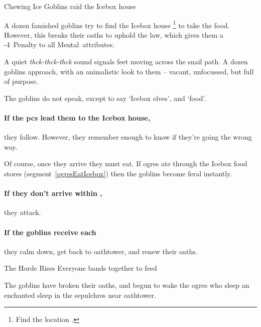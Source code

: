\begin{multicols}{2}
\stupifiedElf

\showStdSpells

{Chewing Ice}%
{Goblins raid the Icebox house}%

A dozen famished goblins try to find the Icebox house%
\footnote{Find the location .}
to take the food.
However, this breaks their oaths to uphold the law, which gives them a -4~Penalty to all Mental~\glspl{attribute}.

\begin{boxtext}
  A quiet \textit{thck-thck-thck} sound signals feet moving across the snail path.
  A dozen goblins approach, with an animalistic look to them -- vacant, unfocussed, but full of purpose.
\end{boxtext}

The goblins do not speak, except to say `Icebox elves', and `food'.

\paragraph{If the \glspl{pc} lead them to the Icebox house,}
they follow.
However, they remember enough to know if they're going the wrong way.

Of course, once they arrive they must eat.
If \glspl{ogre} ate through the Icebox food stores (\gls{segment}~\vref{ogresEatIcebox}) then the goblins become feral instantly.


\paragraph{If they don't arrive within ,}
they attack.

\paragraph{If the goblins receive  each}
they calm down, get back to \gls{oathtower}, and renew their oaths.


{The Horde Rises}%
{Everyone bands together to feed}%

The goblins have broken their oaths, and begun to wake the \glspl{ogre} who sleep an enchanted sleep in the \glspl{sepulchre} near \gls{oathtower}.

\goblin



\end{multicols}
